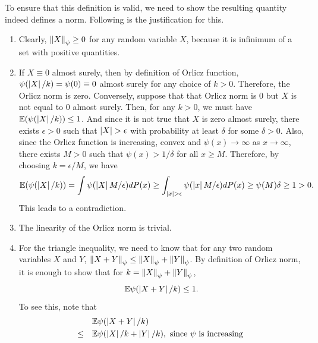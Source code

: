 \documentclass[12pt]{article}
\begin{document}
To ensure that this definition is valid, we need to show the resulting quantity indeed defines a norm. Following is the justification for this.

\begin{enumerate}
    \item Clearly, $\left\Vert X \right\Vert_{\psi} \geq 0$ for any random variable $X$, because it is infinimum of a set with positive quantities.
    \item If $X \equiv 0$ almost surely, then by definition of Orlicz function, $\psi(\left\lvert X \right\rvert/k) = \psi(0) \equiv 0$ almost surely for any choice of $k > 0$. Therefore, the Orlicz norm is zero. Conversely, suppose that that Orlicz norm is $0$ but $X$ is not equal to $0$ almost surely. Then, for any $k > 0$, we must have $\mathbb{E}(\psi(\left\lvert X \right\rvert/k)) \leq 1$. And since it is not true that $X$ is zero almost surely, there exists $\epsilon > 0$ such that $\left\lvert X \right\rvert > \epsilon$ with probability at least $\delta$ for some $\delta > 0$. Also, since the Orlicz function is increasing, convex and $\psi(x) \to \infty$ as $x \to \infty$, there exists $M > 0$ such that $\psi(x) > 1/\delta$ for all $x \geq M$. Therefore, by choosing $k = \epsilon /M$, we have
          \begin{equation*}
              \mathbb{E}(\psi(\left\lvert X \right\rvert/k)) = \int \psi(\left\lvert X \right\rvert M/\epsilon)dP(x) \geq \int_{\left\lvert x \right\rvert > \epsilon} \psi(\left\lvert x \right\rvert M/\epsilon)dP(x) \geq \psi(M)\delta \geq 1 > 0.
          \end{equation*}
          \noindent This leads to a contradiction.
    \item The linearity of the Orlicz norm is trivial.
    \item For the triangle inequality, we need to know that for any two random variables $X$ and $Y$, $\left\Vert X + Y \right\Vert_\psi \leq \left\Vert X \right\Vert_\psi + \left\Vert Y \right\Vert_\psi$. By definition of Orlicz norm, it is enough to show that for $k = \left\Vert X \right\Vert_\psi + \left\Vert Y \right\Vert_\psi$,
          \begin{equation*}
              \mathbb{E}\psi(\left\lvert X + Y \right\rvert/k) \leq 1.
          \end{equation*}
          \noindent To see this, note that
          \begin{align*}
                         & \E\psi(\abs{X + Y}/k)                                                                                                                                                                                                                                       \\
              \leq \quad & \E\psi(\abs{X}/k + \abs{Y}/k), \text{ since } \psi \text{ is increasing }                                                                                                                                                                                   \\

\end{align*}
\end{enumerate}
\end{document}
